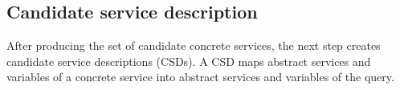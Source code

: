 %



\subsection{Candidate service description}

After producing the set of candidate concrete services, the next step 
creates candidate service descriptions (CSDs). 
A CSD maps abstract services and variables of a concrete service into abstract 
services and variables of the query. 

